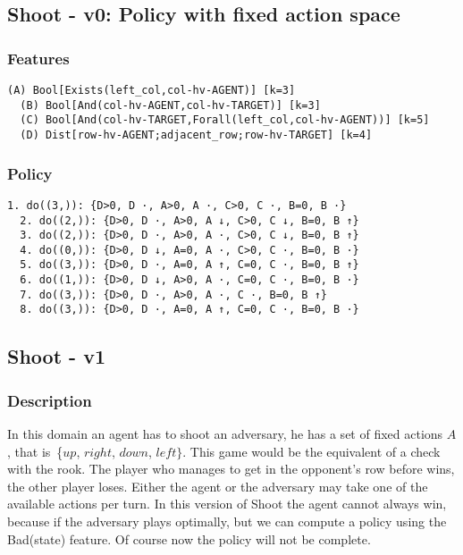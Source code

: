 \documentclass[a4paper]{article}
\begin{document}
\subsection{Shoot - v0: Policy with fixed action space}

\subsubsection{Features}
\begin{Verbatim}[fontsize=\footnotesize]
  (A) Bool[Exists(left_col,col-hv-AGENT)] [k=3]
  (B) Bool[And(col-hv-AGENT,col-hv-TARGET)] [k=3]
  (C) Bool[And(col-hv-TARGET,Forall(left_col,col-hv-AGENT))] [k=5]
  (D) Dist[row-hv-AGENT;adjacent_row;row-hv-TARGET] [k=4]

\end{Verbatim}

\subsubsection{Policy}
\begin{Verbatim}[fontsize=\footnotesize]
  1. do((3,)): {D>0, D ·, A>0, A ·, C>0, C ·, B=0, B ·}
  2. do((2,)): {D>0, D ·, A>0, A ↓, C>0, C ↓, B=0, B ↑}
  3. do((2,)): {D>0, D ·, A>0, A ·, C>0, C ↓, B=0, B ↑}
  4. do((0,)): {D>0, D ↓, A=0, A ·, C>0, C ·, B=0, B ·}
  5. do((3,)): {D>0, D ·, A=0, A ↑, C=0, C ·, B=0, B ↑}
  6. do((1,)): {D>0, D ↓, A>0, A ·, C=0, C ·, B=0, B ·}
  7. do((3,)): {D>0, D ·, A>0, A ·, C ·, B=0, B ↑}
  8. do((3,)): {D>0, D ·, A=0, A ↑, C=0, C ·, B=0, B ·}
\end{Verbatim}

\subsection{Shoot - v1}
\subsubsection{Description}
In this domain an agent has to shoot an adversary, he has a set of fixed actions $A$, that is~\{$up$, $right$, $down$, $left\}$. This game would be the equivalent of a check with the rook. The player who manages to get in the opponent's row before wins, the other player loses. Either the agent or the adversary may take one of the available actions per turn. In this version of Shoot the agent cannot always win, because if the adversary plays optimally, but we can compute a policy using the Bad(state) feature. Of course now the policy will not be complete.
\end{document}
